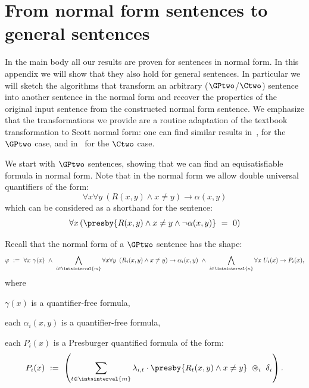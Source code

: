 \section{From normal form sentences to general sentences} \label{app:normal}

In the main body all our results are proven for sentences in normal form.
In this appendix we will show that they also hold for general sentences.
In particular we will sketch the algorithms that transform an arbitrary ($\GPtwo$/$\Ctwo$) sentence into another sentence in the normal form and recover the properties of the original input sentence from the constructed normal form sentence.
We emphasize that the transformations we provide are a routine adaptation of the textbook transformation to Scott normal form: one can find similar results 
in~\cite{twovarpres}, for the $\GPtwo$ case,
and in~\cite{ctwocomplexity} for the $\Ctwo$ case.

We start with $\GPtwo$ sentences, showing that we can find an equisatisfiable formula in normal form.
Note that in the normal form we allow double universal quantifiers of the form:
$$
\forall x \forall y\ \left(R(x,y) \land x \neq y\right) \to \alpha(x, y)
$$
which can be considered as a shorthand for the  sentence:
$$
\forall x 
\left(
\presby{R(x, y) \land x \neq y\land \neg \alpha(x,y)}
\ =\ 0 
\right)
$$

Recall that the normal form of a $\GPtwo$ sentence has the shape:
\begin{equation*}
    \varphi\ :=\ 
    \forall x\ \gamma(x)\ \land\ 
    \bigwedge_{i \in \intsinterval{m}} \forall x \forall y\ \left(R_i(x,y) \land x \neq y\right) \to \alpha_i(x, y)\ \land\ 
    \bigwedge_{i \in \intsinterval{n}} \forall x\ U_i(x) \to P_i(x),
\end{equation*}
where
\begin{compactitem}
    \item $\gamma(x)$ is a quantifier-free formula,
    \item each $\alpha_i(x, y)$ is a quantifier-free formula,
    \item each $P_i(x)$ is a Presburger quantified formula of the form: 
    \begin{equation*}
        P_i(x)\ :=\ \left(
        \sum_{t \in \intsinterval{m}} \lambda_{i, t} \cdot \presby{R_t(x, y) \land x \neq y}
        \ \circledast_i\ \delta_i \right).
    \end{equation*}
\end{compactitem}

